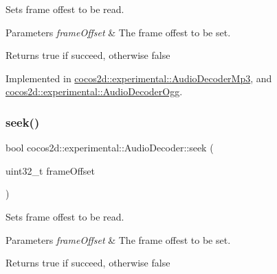 Sets frame offest to be read. 


\begin{DoxyParams}{Parameters}
{\em frame\+Offset} & The frame offest to be set. \\
\hline
\end{DoxyParams}
\begin{DoxyReturn}{Returns}
true if succeed, otherwise false 
\end{DoxyReturn}


Implemented in \hyperlink{classcocos2d_1_1experimental_1_1AudioDecoderMp3_a997804dcef5a632730f0efea296374f2}{cocos2d\+::experimental\+::\+Audio\+Decoder\+Mp3}, and \hyperlink{classcocos2d_1_1experimental_1_1AudioDecoderOgg_ae9baafa8fb2c6f887462be0cfd1388a6}{cocos2d\+::experimental\+::\+Audio\+Decoder\+Ogg}.

\mbox{\label{classcocos2d_1_1experimental_1_1AudioDecoder_a59f8d937bf5fb9130bef774879ec60f4}} 
\subsubsection{\texorpdfstring{seek()}{seek()}\hspace{0.1cm}{\footnotesize\ttfamily [2/2]}}
{\footnotesize\ttfamily bool cocos2d\+::experimental\+::\+Audio\+Decoder\+::seek (\begin{DoxyParamCaption}\item[{uint32\+\_\+t}]{frame\+Offset }\end{DoxyParamCaption})}



Sets frame offest to be read. 


\begin{DoxyParams}{Parameters}
{\em frame\+Offset} & The frame offest to be set. \\
\hline
\end{DoxyParams}
\begin{DoxyReturn}{Returns}
true if succeed, otherwise false 
\end{DoxyReturn}
\mbox{\label{classcocos2d_1_1experimental_1_1AudioDecoder_a6c7f6cb06a8eb9e584ff6097a3f37e95}} 
